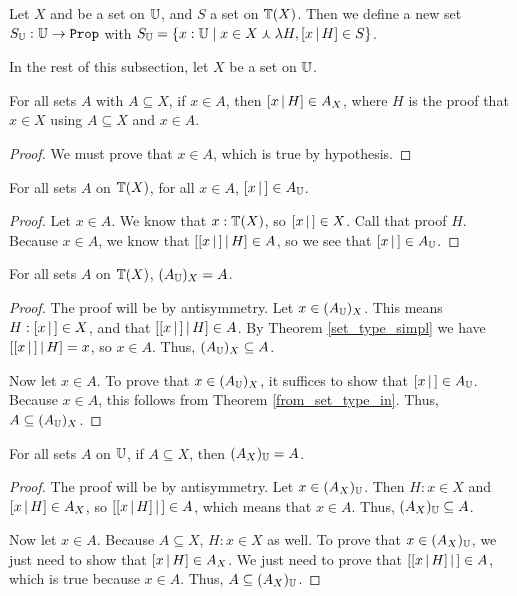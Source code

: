 \documentclass[../math.tex]{subfiles}
\begin{document}
\begin{definition}
    Let $X$ and be a set on $\mathbb{U}$, and $S$ a set on $\mathbb{T}(X)$.  Then we define a
    new set $S_\U : \U \rightarrow \Prop$ with $S_{\mathbb{U}} = \{x : \mathbb{U} \mid x \in X
    \curlywedge \lambda H, [ x \, | \, H ] \in S\}$.
\end{definition}

In the rest of this subsection, let $X$ be a set on $\mathbb{U}$.

\begin{theorem} \label{to_set_type_in}
    For all sets $A$ with $A \subseteq X$, if $x \in A$, then $[ x \, | \, H ] \in
    A_X$, where $H$ is the proof that $x \in X$ using $A \subseteq X$ and $x \in
    A$.
\end{theorem}
\begin{proof}
    We must prove that $x \in A$, which is true by hypothesis.
\end{proof}

\begin{theorem} \label{from_set_type_in}
    For all sets $A$ on $\mathbb{T}(X)$, for all $x \in A$, $[ x\, |\,] \in A_{\mathbb{U}}$.
\end{theorem}
\begin{proof}
    Let $x \in A$.  We know that $x : \mathbb{T}(X)$, so $[ x\, |\,] \in X$.  Call that
    proof $H$.  Because $x \in A$, we know that $[ [ x\, |\,] \, | \, H ] \in A$, so we
    see that $[ x\, |\,] \in A_{\mathbb{U}}$.
\end{proof}

\begin{theorem} \label{to_from_set_type}
    For all sets $A$ on $\mathbb{T}(X)$, $(A_{\mathbb{U}})_X = A$.
\end{theorem}
\begin{proof}
    The proof will be by antisymmetry.  Let $x \in (A_{\mathbb{U}})_X$.  This means $H :
    [ x\, |\,] \in X$, and that $[ [ x\, |\,] \, | \, H ] \in A$.  By Theorem
    \ref{set_type_simpl} we have $[ [ x\, |\,] \, | \, H ] = x$, so $x \in A$.  Thus,
    $(A_{\mathbb{U}})_X \subseteq A$.

    Now let $x \in A$.  To prove that $x \in (A_{\mathbb{U}})_X$, it suffices to show that
    $[ x\, |\,] \in A_{\mathbb{U}}$.  Because $x \in A$, this follows from Theorem
    \ref{from_set_type_in}.  Thus, $A \subseteq (A_{\mathbb{U}})_X$.
\end{proof}

\begin{theorem} \label{from_to_set_type}
    For all sets $A$ on $\mathbb{U}$, if $A \subseteq X$, then $(A_X)_{\mathbb{U}} = A$.
\end{theorem}
\begin{proof}
    The proof will be by antisymmetry.  Let $x \in (A_X)_{\mathbb{U}}$.  Then $H : x \in
    X$ and $[ x \, | \, H ] \in A_X$, so $[ [ x \, | \, H ]\, |\,] \in A$, which means that $x
    \in A$.  Thus, $(A_X)_{\mathbb{U}} \subseteq A$.

    Now let $x \in A$.  Because $A \subseteq X$, $H : x \in X$ as well.  To
    prove that $x \in (A_X)_{\mathbb{U}}$, we just need to show that $[ x \, | \, H ] \in A_X$.
    We just need to prove that $[ [ x \, | \, H ]\, |\,] \in A$, which is true because $x
    \in A$.  Thus, $A \subseteq (A_X)_{\mathbb{U}}$.
\end{proof}
\end{document}
